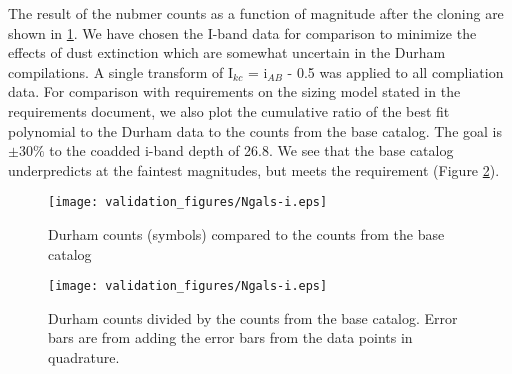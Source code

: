\documentclass[]{article}
\begin{document}
The result of the nubmer counts as a function of magnitude after the cloning are shown in \ref{fig:gcounts}.  We have chosen the I-band data for comparison to 
minimize the effects of dust extinction which are somewhat uncertain in the Durham compilations.  A single transform of I$_{kc}$ = i$_{AB}$ - 0.5 was applied to
all compliation data.  For comparison with requirements on the sizing model stated in the requirements document, we also plot the cumulative ratio of the best fit polynomial
to the Durham data to the counts from the base catalog.  The goal is $\pm30\%$ to the coadded i-band depth of 26.8.  We see that the base catalog
underpredicts at the faintest magnitudes, but meets the requirement (Figure \ref{fig:gratio}).

\begin{figure}
\centering
\texttt{[image: validation\_figures/Ngals-i.eps]}
\caption{Durham counts (symbols) compared to the counts from the base catalog \label{fig:gcounts}}
\end{figure}
\begin{figure}
\centering
\texttt{[image: validation\_figures/Ngals-i.eps]}
\caption{Durham counts divided by the counts from the base catalog.  Error bars are from adding the error bars from the data points in quadrature. \label{fig:gratio}}
\end{figure}
\end{document}
